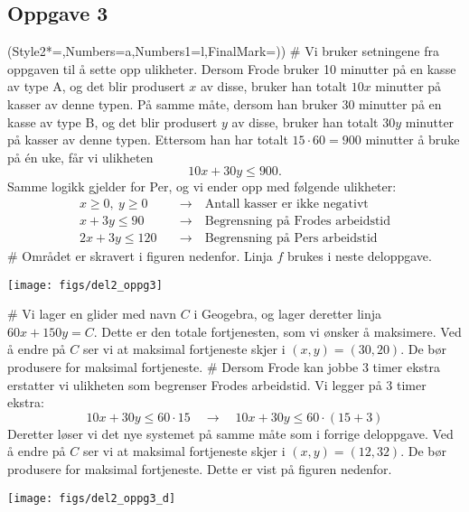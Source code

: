 \subsection*{Oppgave 3}
\begin{easylist}[enumerate]
	\ListProperties(Style2*=,Numbers=a,Numbers1=l,FinalMark={)})
	# Vi bruker setningene fra oppgaven til å sette opp ulikheter. Dersom Frode bruker 10 minutter på en kasse av type A, og det blir produsert $x$ av disse, bruker han totalt $10x$ minutter på kasser av denne typen. På samme måte, dersom han bruker 30 minutter på en kasse av type B, og det blir produsert $y$ av disse, bruker han totalt $30y$ minutter på kasser av denne typen. Ettersom han har totalt $15 \cdot 60 = 900$ minutter å bruke på én uke, får vi ulikheten
	\begin{equation*}
		10x + 30 y \leq 900.
	\end{equation*}
	Samme logikk gjelder for Per, og vi ender opp med følgende ulikheter:
	\begin{align*}
		x \geq 0, \ y \geq 0 & \quad \rightarrow \quad \text{Antall kasser er ikke negativt} \\
		x + 3y \leq 90 & \quad \rightarrow \quad \text{Begrensning på Frodes arbeidstid} \\
		2x + 3y \leq 120 & \quad \rightarrow \quad \text{Begrensning på Pers arbeidstid}
	\end{align*}
	# Området er skravert i figuren nedenfor. Linja $f$ brukes i neste deloppgave.
	\begin{center}
		\texttt{[image: figs/del2\_oppg3]}
	\end{center}
	# Vi lager en glider med navn $C$ i Geogebra, og lager deretter linja $60x + 150 y = C$. Dette er den totale fortjenesten, som vi ønsker å maksimere. Ved å endre på $C$ ser vi at maksimal fortjeneste skjer i $(x, y) = (30, 20)$. De bør produsere  for maksimal fortjeneste.
	# Dersom Frode kan jobbe 3 timer ekstra erstatter vi ulikheten som begrenser Frodes arbeidstid. Vi legger på 3 timer ekstra:
	\begin{equation*}
		10x + 30y \leq 60 \cdot 15 \quad \rightarrow \quad10x + 30y \leq 60 \cdot (15 + 3)
	\end{equation*}
	Deretter løser vi det nye systemet på samme måte som i forrige deloppgave. Ved å endre på $C$ ser vi at maksimal fortjeneste skjer i $(x, y) = (12, 32)$. De bør produsere  for maksimal fortjeneste. Dette er vist på figuren nedenfor.
	
	\begin{center}
		\texttt{[image: figs/del2\_oppg3\_d]}
	\end{center}
\end{easylist}

